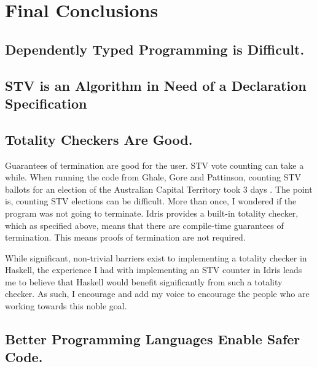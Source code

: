 \chapter{Final Conclusions}

\section{Dependently Typed Programming is Difficult.}

\section{STV is an Algorithm in Need of a Declaration Specification}

\section{Totality Checkers Are Good.}

Guarantees of termination are good for the user. STV vote counting can take a
while. When running the code from Ghale, Gore and Pattinson, counting STV
ballots for an election of the Australian Capital Territory took 3 days
\cite{stv_haskell}. The point is, counting STV elections can be difficult. More
than once, I wondered if the program was not going to terminate. Idris provides
a built-in totality checker, which as specified above, means that there are
compile-time guarantees of termination. This means proofs of termination are not
required. 


While significant, non-trivial barriers exist to implementing a totality checker
in Haskell, the experience I had with implementing an STV counter in Idris leads
me to believe that Haskell would benefit significantly from such a totality
checker. As such, I encourage and add my voice to encourage the people who are
working towards this noble goal. 

\section{Better Programming Languages Enable Safer Code.}